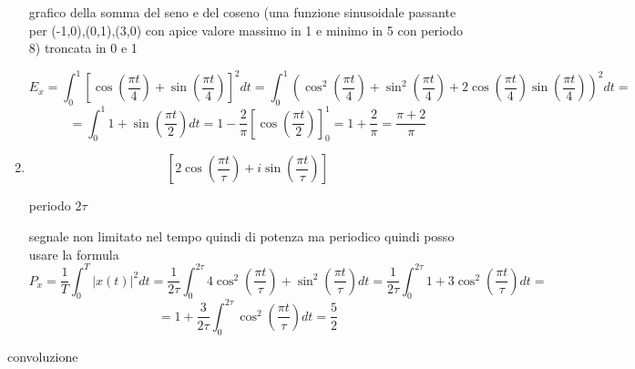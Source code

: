 \documentclass{article}
\begin{document}
\begin{enumerate}
        \begin{center}grafico della somma del seno e del coseno (una funzione sinusoidale passante per (-1,0),(0,1),(3,0) con apice valore massimo in 1 e minimo in 5 con periodo 8) troncata in 0 e 1\end{center}
        \[E_x=\int_{0}^{1}{\left[\cos\left(\frac{\pi t}{4}\right)+\sin\left(\frac{\pi t}{4}\right)\right]}^2dt=\int_{0}^{1}{\left(\cos^2\left(\frac{\pi t}{4}\right)+\sin^2\left(\frac{\pi t}{4}\right)+2\cos\left(\frac{\pi t}{4}\right)\sin\left(\frac{\pi t}{4}\right)\right)}^2dt=\]
        \[=\int_0^1 1+\sin\left(\frac{\pi t}{2}\right)dt=1-\frac{2}{\pi}{\left[\cos\left(\frac{\pi t}{2}\right)\right]}_0^1=1+\frac{2}{\pi}=\frac{\pi+2}{\pi}\]\newpage
    \item \LARGE\[\left[2\cos\left(\frac{\pi t}{\tau}\right)+i\sin\left(\frac{\pi t}{\tau}\right)\right]\]\normalsize
        \begin{center}periodo \(2\tau\)\end{center}
        segnale non limitato nel tempo quindi di potenza ma periodico quindi posso usare la formula
        \[P_x=\frac{1}{T}\int_{0}^{T}|x(t)|^2 dt=\frac{1}{2\tau}\int_{0}^{2\tau}4\cos^2\left(\frac{\pi t}{\tau}\right)+\sin^2\left(\frac{\pi t}{\tau}\right)dt=\frac{1}{2\tau}\int_{0}^{2\tau}1+3\cos^2\left(\frac{\pi t}{\tau}\right)dt=\]
        \[=1+\frac{3}{2\tau}\int_{0}^{2\tau}\cos^2\left(\frac{\pi t}{\tau}\right)dt=\frac{5}{2}\]
\end{enumerate}
\begin{center}convoluzione\end{center}
\end{document}
